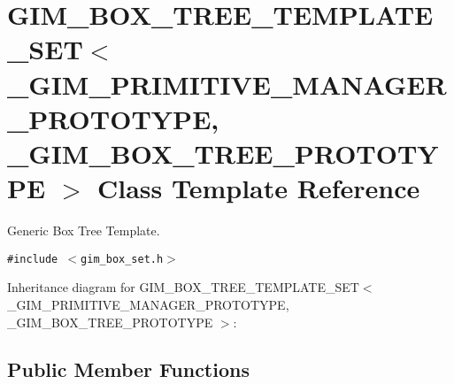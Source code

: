 \hypertarget{class_g_i_m___b_o_x___t_r_e_e___t_e_m_p_l_a_t_e___s_e_t}{
\section{GIM\_\-BOX\_\-TREE\_\-TEMPLATE\_\-SET$<$ \_\-GIM\_\-PRIMITIVE\_\-MANAGER\_\-PROTOTYPE, \_\-GIM\_\-BOX\_\-TREE\_\-PROTOTYPE $>$ Class Template Reference}
\label{class_g_i_m___b_o_x___t_r_e_e___t_e_m_p_l_a_t_e___s_e_t}
}
Generic Box Tree Template.  


{\tt \#include $<$gim\_\-box\_\-set.h$>$}

Inheritance diagram for GIM\_\-BOX\_\-TREE\_\-TEMPLATE\_\-SET$<$ \_\-GIM\_\-PRIMITIVE\_\-MANAGER\_\-PROTOTYPE, \_\-GIM\_\-BOX\_\-TREE\_\-PROTOTYPE $>$:\subsection*{Public Member Functions}
